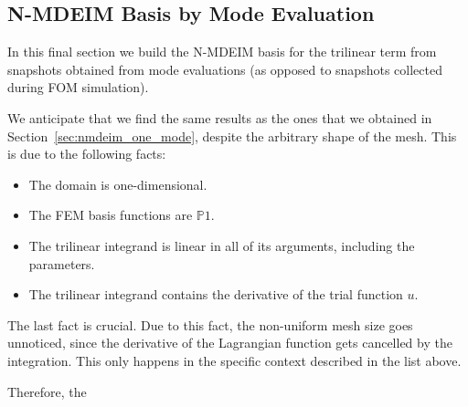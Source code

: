 \documentclass[../../thesis.tex]{subfiles}
\begin{document}
\clearpage
\subsection{N-MDEIM Basis by Mode Evaluation}
In this final section we build the N-MDEIM basis for the trilinear term
from snapshots obtained from mode evaluations 
(as opposed to snapshots collected during FOM simulation).

We anticipate that we find the same results as the ones that we obtained in
Section~\ref{sec:nmdeim_one_mode}, despite the arbitrary shape of the mesh.
This is due to the following facts:
\begin{itemize}
    \item The domain is one-dimensional.
    \item The FEM basis functions are $\mathbb{P}1$.
    \item The trilinear integrand is linear in all of its arguments, including the parameters.
    \item The trilinear integrand contains the derivative of the trial function $u$.
\end{itemize}
The last fact is crucial. 
Due to this fact, the non-uniform mesh size goes unnoticed, 
since the derivative of the Lagrangian function gets cancelled by the integration.
This only happens in the specific context described in the list above.

Therefore, the 
\end{document}
